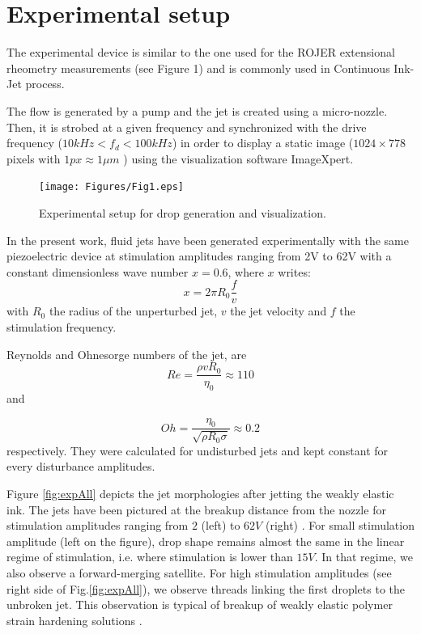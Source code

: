 \documentclass[onecolumn, 12pt]{asme2ej}
\begin{document}
\section{Experimental setup}
The experimental device is similar to the one used for the ROJER extensional rheometry measurements \cite{rodriguez2015experimental} (see Figure 1) and is commonly used in Continuous Ink-Jet process. 

The flow is generated by a pump and the jet is created using a micro-nozzle. Then, it is strobed at a given frequency and synchronized with the drive frequency ($10 kHz < f_d < 100 kHz$) in order to display a static image ($1024\times778$ pixels with $1 px \approx 1 \mu m$ ) using the visualization software ImageXpert.

\begin{figure}[h]
    \centering
    \texttt{[image: Figures/Fig1.eps]}
    \caption{Experimental setup for drop generation and visualization.}
    \label{device}
\end{figure}

In the present work, fluid jets have been generated experimentally with the same piezoelectric device at stimulation amplitudes ranging from 2V to 62V with a constant dimensionless wave number $x = 0.6$, where $x$ writes:
\begin{equation}\label{eq:waveNbr}
    x=2 \pi R_0 \frac{f}{v}
\end{equation}
with $R_0$ the radius of the unperturbed jet, $v$ the jet velocity and $f$ the stimulation frequency. 

Reynolds and Ohnesorge numbers of the jet, are
\begin{equation}
    Re= \frac{\rho v R_0 }{\eta_0}  \approx 110
\end{equation} and 
   
\begin{equation}
    Oh= \frac{\eta_0}{\sqrt{\rho R_0 \sigma}} \approx 0.2
\end{equation}
respectively. They were calculated for undisturbed jets and kept constant for every disturbance amplitudes.



Figure \ref{fig:expAll} depicts the jet morphologies after jetting the weakly elastic ink. The jets have been pictured at the breakup distance from the nozzle for stimulation amplitudes ranging from $2$ (left) to $62V$ (right) . 
For small stimulation amplitude (left on the figure), drop shape remains almost the same in the linear regime of stimulation, i.e. where stimulation is lower than $15V$. In that regime, we also observe a forward-merging satellite. For high stimulation amplitudes (see right side of Fig.\ref{fig:expAll}), we observe threads linking the first droplets to the unbroken jet. This observation is typical of breakup of weakly elastic polymer strain hardening solutions \cite{christanti2002effect}.
\end{document}
